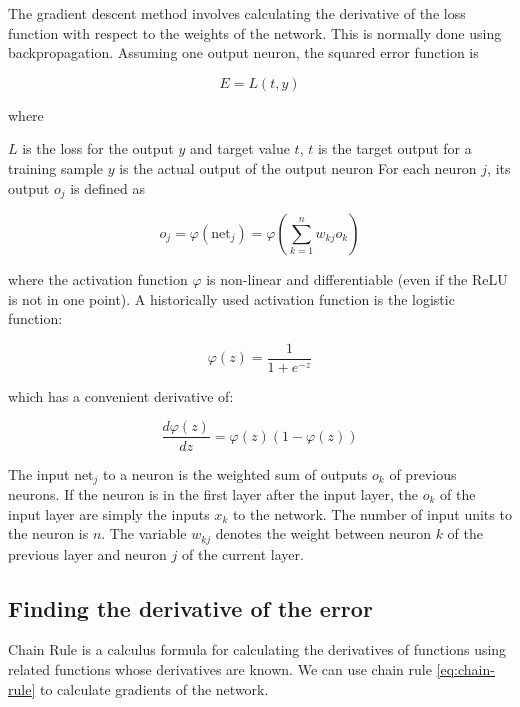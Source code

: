 The gradient descent method involves calculating the derivative of the loss function with respect to the weights of the network. This is normally done using backpropagation. Assuming one output neuron, the squared error function is

\begin{equation}
    \label{eq:gradient_error}
    E=L(t,y)
\end{equation}

where

$L$ is the loss for the output $y$ and target value $t$,
$t$ is the target output for a training sample
$y$ is the actual output of the output neuron
For each neuron $j$, its output $o_{j}$ is defined as

\begin{equation}
    \label{eq:gradient_net_output}
    o_{j}=\varphi ({\text{net}}_{j})=\varphi \left(\sum _{k=1}^{n}w_{kj}o_{k}\right)
\end{equation}

where the activation function $\varphi$  is non-linear and differentiable (even if the ReLU is not in one point). A historically used activation function is the logistic function:

\begin{equation}
    \label{eq:activation}
    \varphi (z)={\frac {1}{1+e^{-z}}}
\end{equation}

which has a convenient derivative of:

\begin{equation}
    \label{eq:activation_derivative}
    \frac {d\varphi (z)}{dz}=\varphi (z)(1-\varphi (z))
\end{equation}

The input $\text{net}_{j}$ to a neuron is the weighted sum of outputs $o_k$ of previous neurons. If the neuron is in the first layer after the input layer, the $o_k$ of the input layer are simply the inputs $x_{k}$ to the network. The number of input units to the neuron is $n$. The variable $w_{kj}$ denotes the weight between neuron $k$ of the previous layer and neuron $j$ of the current layer.

\subsection{Finding the derivative of the error}

Chain Rule is a calculus formula for calculating the derivatives of functions using related functions whose derivatives are known. We can use chain rule \ref{eq:chain-rule} to calculate gradients of the network.


